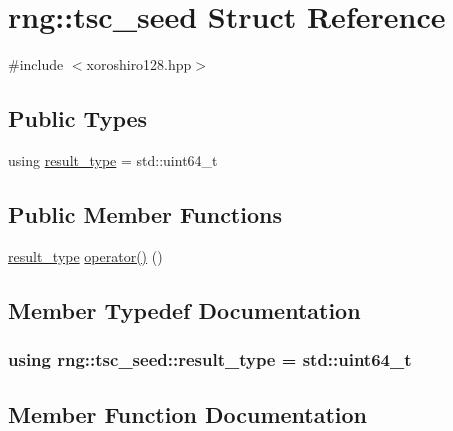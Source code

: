 \hypertarget{structrng_1_1tsc__seed}{}\section{rng\+:\+:tsc\+\_\+seed Struct Reference}
\label{structrng_1_1tsc__seed}


{\ttfamily \#include $<$xoroshiro128.\+hpp$>$}

\subsection*{Public Types}
\begin{DoxyCompactItemize}
\item 
using \hyperlink{structrng_1_1tsc__seed_a05c16f9b935c21f149451c12ddb31d16}{result\+\_\+type} = std\+::uint64\+\_\+t
\end{DoxyCompactItemize}
\subsection*{Public Member Functions}
\begin{DoxyCompactItemize}
\item 
\hyperlink{structrng_1_1tsc__seed_a05c16f9b935c21f149451c12ddb31d16}{result\+\_\+type} \hyperlink{structrng_1_1tsc__seed_a55949da9d3b5acb54f0f87e1707c3c73}{operator()} ()
\end{DoxyCompactItemize}


\subsection{Member Typedef Documentation}
\subsubsection[{\texorpdfstring{result\+\_\+type}{result_type}}]{\setlength{\rightskip}{0pt plus 5cm}using {\bf rng\+::tsc\+\_\+seed\+::result\+\_\+type} =  std\+::uint64\+\_\+t}\hypertarget{structrng_1_1tsc__seed_a05c16f9b935c21f149451c12ddb31d16}{}\label{structrng_1_1tsc__seed_a05c16f9b935c21f149451c12ddb31d16}


\subsection{Member Function Documentation}
